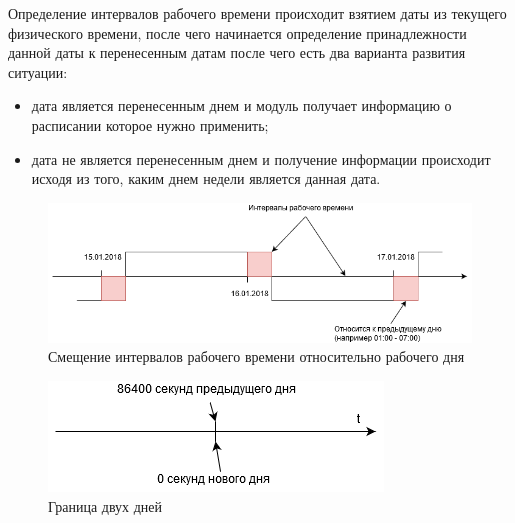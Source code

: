 \indent Определение интервалов рабочего времени происходит взятием даты из текущего физического времени, после чего начинается определение принадлежности данной даты к перенесенным датам после чего есть два варианта развития ситуации:

\begin{itemize}
	\item дата является перенесенным днем и модуль получает информацию о расписании которое нужно применить;
	\item дата не является перенесенным днем и получение информации происходит исходя из того, каким днем недели является данная дата.
\end{itemize}

\begin{figure}[h]
	\includegraphics[width=\linewidth]{pics/scheduleIntervals.png}
	\caption{Смещение интервалов рабочего времени относительно рабочего дня}
	\label{fig:intervals}
	\centering
\end{figure}

\begin{figure}[h]
	\includegraphics[width=\linewidth]{pics/scheduleTime.png}
	\caption{Граница двух дней}
	\label{fig:time}
	\centering
\end{figure}


